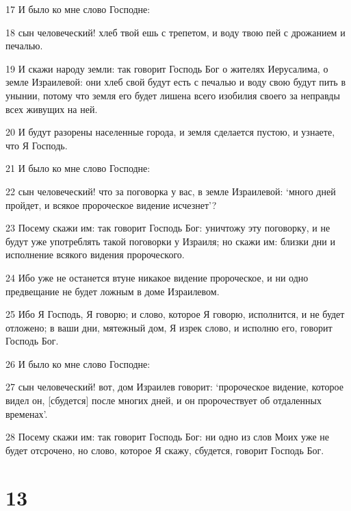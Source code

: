 \par 17 И было ко мне слово Господне:
\par 18 сын человеческий! хлеб твой ешь с трепетом, и воду твою пей с дрожанием и печалью.
\par 19 И скажи народу земли: так говорит Господь Бог о жителях Иерусалима, о земле Израилевой: они хлеб свой будут есть с печалью и воду свою будут пить в унынии, потому что земля его будет лишена всего изобилия своего за неправды всех живущих на ней.
\par 20 И будут разорены населенные города, и земля сделается пустою, и узнаете, что Я Господь.
\par 21 И было ко мне слово Господне:
\par 22 сын человеческий! что за поговорка у вас, в земле Израилевой: `много дней пройдет, и всякое пророческое видение исчезнет'?
\par 23 Посему скажи им: так говорит Господь Бог: уничтожу эту поговорку, и не будут уже употреблять такой поговорки у Израиля; но скажи им: близки дни и исполнение всякого видения пророческого.
\par 24 Ибо уже не останется втуне никакое видение пророческое, и ни одно предвещание не будет ложным в доме Израилевом.
\par 25 Ибо Я Господь, Я говорю; и слово, которое Я говорю, исполнится, и не будет отложено; в ваши дни, мятежный дом, Я изрек слово, и исполню его, говорит Господь Бог.
\par 26 И было ко мне слово Господне:
\par 27 сын человеческий! вот, дом Израилев говорит: `пророческое видение, которое видел он, [сбудется] после многих дней, и он пророчествует об отдаленных временах'.
\par 28 Посему скажи им: так говорит Господь Бог: ни одно из слов Моих уже не будет отсрочено, но слово, которое Я скажу, сбудется, говорит Господь Бог.

\chapter{13}

